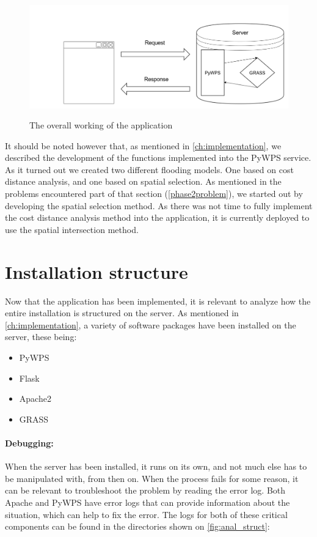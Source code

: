 \begin{figure}[h!]
\centering
	{\includegraphics[width=\linewidth]{gfx/Analysis_Architecture/grass_pywps.png}}
\caption{The overall working of the application}
\label{fig:grass_archi}
\end{figure}

It should be noted however that, as mentioned in \autoref{ch:implementation}, we described the development of the functions implemented into the PyWPS service. As it turned out we created two different flooding models. One based on cost distance analysis, and one based on spatial selection. As mentioned in the problems encountered part of that section (\autoref{phase2problem}), we started out by developing the spatial selection method. As there was not time to fully implement the cost distance analysis method into the application, it is currently deployed to use the spatial intersection method.

\section{Installation structure}

Now that the application has been implemented, it is relevant to analyze how the entire installation is structured on the server. As mentioned in \autoref{ch:implementation}, a variety of software packages have been installed on the server, these being: 

\begin{itemize}
\item PyWPS
\item Flask
\item Apache2
\item GRASS
\end{itemize}

\paragraph{Debugging:} When the server has been installed, it runs on its own, and not much else has to be manipulated with, from then on. When the process fails for some reason, it can be relevant to troubleshoot the problem by reading the error log. Both Apache and PyWPS have error logs that can provide information about the situation, which can help to fix the error. The logs for both of these critical components can be found in the directories shown on \autoref{fig:anal_struct}:\\

